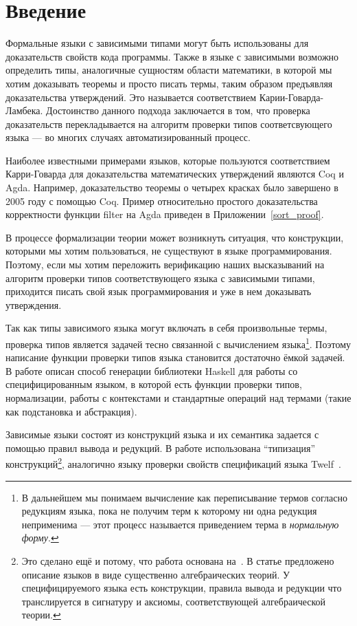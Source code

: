 \section*{Введение}
Формальные языки с зависимыми типами могут быть использованы для доказательств свойств кода программы. Также в языке с зависимыми возможно определить типы, аналогичные сущностям области математики, в которой мы хотим доказывать теоремы и просто писать термы, таким образом предъявляя доказательства утверждений. Это называется соответствием Карии-Говарда-Ламбека\cite{curry_how}. Достоинство данного подхода заключается в том, что проверка доказательств перекладывается на алгоритм проверки типов соответсвующего языка --- во многих случаях автоматизированный процесс.

Наиболее известными примерами языков, которые пользуются соответствием Карри-Говарда для доказательства математических утверждений являются Coq\cite{coq} и Agda\cite{agda}. Например, доказательство теоремы о четырех красках было завершено в 2005 году с помощью Coq\cite{weisstein2002four}.
Пример относительно простого доказательства корректности функции filter на Agda приведен в Приложении~\ref{sort_proof}.

\hfill

В процессе формализации теории может возникнуть ситуация, что конструкции, которыми мы хотим пользоваться, не существуют в языке программирования. Поэтому, если мы хотим переложить верификацию наших высказываний на алгоритм проверки типов соответствующего языка с зависимыми типами, приходится писать свой язык программирования и уже в нем доказывать утверждения.

Так как типы зависимого языка могут включать в себя произвольные термы, проверка типов является задачей тесно связанной с вычислением языка\footnote{В дальнейшем мы понимаем вычисление как переписывание термов согласно редукциям языка, пока не получим терм к которому ни одна редукция неприменима --- этот процесс называется приведением терма в \textit{нормальную форму}.}. Поэтому написание функции проверки типов языка становится достаточно ёмкой задачей. В работе описан способ генерации библиотеки Haskell\cite{haskell} для работы со специфицированным языком, в которой есть функции проверки типов, нормализации, работы с контекстами и стандартные операций над термами (такие как подстановка и абстракция).

\hfill

Зависимые языки состоят из конструкций языка и их семантика задается с помощью правил вывода и редукций. В работе использована ``типизация'' конструкций\footnote{Это сделано ещё и потому, что работа основана на~\cite{isaev}. В статье предложено описание языков в виде существенно алгебраических теорий. У специфицируемого языка есть конструкции, правила вывода и редукции что транслируется в сигнатуру и аксиомы, соответствующей алгебраической теории.}, аналогично языку проверки свойств спецификаций языка Twelf~\cite{twelf}.

